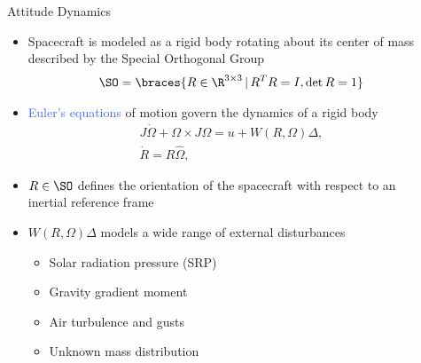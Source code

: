 \documentclass[final, usenames, dvipsnames]{beamer}
\newlength{\onecolwidth}
\newlength{\twocolwidth}
\def\Emph{\textcolor{RoyalBlue}}
\begin{document}
\begin{frame}[t]
\begin{columns}[T,onlytextwidth]
\begin{column}{\onecolwidth}
\begin{block}{Attitude Dynamics} %
	\begin{itemize}
		\item Spacecraft is modeled as a rigid body rotating about its center of mass described by the Special Orthogonal Group
			\begin{align*}
				\SO = \braces{R \in \R^{3\times3} \, | \, R^TR = I, \det{R} = 1}
			\end{align*}
		\item \Emph{Euler's equations} of motion govern the dynamics of a rigid body
			\begin{gather*}
				J\dot\Omega + \Omega\times J\Omega = u+W(R,\Omega)\Delta ,\label{eqn:Wdot}\\
				\dot R = R\hat\Omega ,\label{eqn:Rdot}
			\end{gather*}
		\item \( R \in \SO \) defines the orientation of the spacecraft with respect to an inertial reference frame
		\item \( W(R, \Omega) \Delta \) models a wide range of external disturbances
		\begin{itemize}
			\item Solar radiation pressure (SRP)
			\item Gravity gradient moment
			\item Air turbulence and gusts
			\item Unknown mass distribution 
		\end{itemize}
	\end{itemize}
	
\end{block} %
\end{column}  %

\begin{column}{\twocolwidth} %


\end{column}
\end{columns}
\end{frame}
\end{document}
